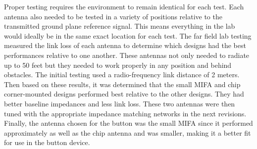 \documentclass[journal,compsoc]{IEEEtran}
\begin{document}
Proper testing requires the environment to remain identical for each test.  Each antenna also needed to be tested in a variety of positions relative to the transmitted ground plane reference signal.  This means everything in the lab would ideally be in the same exact location for each test.  The far field lab testing measured the link loss of each antenna to determine which designs had the best performances relative to one another.   These antennas not only needed to radiate up to 50 feet but they needed to work properly in any position and behind obstacles.  The initial testing used a radio-frequency link distance of 2 meters.  Then based on these results, it was determined that the small MIFA and chip corner-mounted designs performed best relative to the other designs.  They had better baseline impedances and less link loss.  These two antennas were then tuned with the appropriate impedance matching networks in the next revisions.  Finally, the antenna chosen for the button was the small MIFA since it performed approximately as well as the chip antenna and was smaller, making it a better fit for use in the button device.
\end{document}
